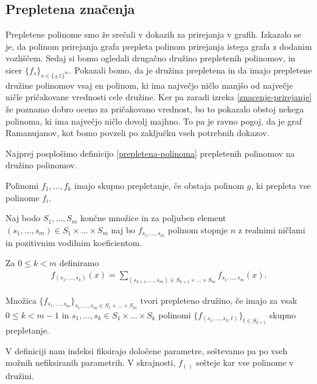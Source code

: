\subsection{Prepletena značenja}
Prepletene polinome smo že srečali v dokazih za prirejanja v grafih. Izkazalo se je, da polinom prirejanja grafa prepleta polinom prirejanja istega grafa z dodanim vozliščem. Sedaj si bomo ogledali drugačno družino prepletenih polinomov, in sicer \(\{f_s\}_{s\in \{\pm 1\}^m}\). Pokazali bomo, da je družina prepletena in da imajo prepletene družine polinomov vsaj en polinom, ki ima največjo ničlo manjšo od največje ničle pričakovane vrednosti cele družine. Ker pa zaradi izreka \ref{znacenje-prirejanje} že poznamo dobro oceno za pričakovano vrednost, bo to pokazalo obstoj nekega polinoma, ki ima največjo ničlo dovolj majhno. To pa je ravno pogoj, da je graf Ramanujanov, kot bomo povzeli po zaključku vseh potrebnih dokazov.

Najprej posplošimo definicijo \ref{prepletena-polinoma} prepletenih polinomov na družino polinomov.
\begin{definicija}
    Polinomi \(f_1, \ldots, f_k\) imajo skupno prepletanje, če obstaja polinom \(g\), ki prepleta vse polinome \(f_i\).
\end{definicija}
\begin{definicija}\label{prepletena-druzina}
    Naj bodo \(S_1, \ldots, S_m\) končne množice in za poljuben element \((s_1, \ldots, s_m)\in S_1\times \ldots \times S_m\) naj bo \(f_{s_1, \ldots, s_m}\) polinom stopnje \(n\) z realnimi ničlami in pozitivnim vodilnim koeficientom.

    Za \(0\leq k<m\) definiramo
    \begin{align*}
        f_{(s_1, \ldots, s_k)}(x) = \sum_{(s_{k+1}, \ldots, s_m)\in S_{k+1}\times \ldots \times S_m} f_{s_1, \ldots, s_m}(x).
    \end{align*}

    Množica \(\{f_{s_1,\ldots, s_m}\}_{s_1,\ldots, s_m\in S_1\times \ldots \times S_m}\) tvori prepleteno družino, če imajo za vsak \(0\leq k<m-1\) in \(s_1, \ldots, s_k\in S_1\times \ldots \times S_k\) polinomi \(\{f_{(s_1, \ldots, s_k, t)}\}_{t\in S_{k+1}}\)  skupno prepletanje.
\end{definicija}
V definiciji nam indeksi fiksirajo določene parametre, seštevamo pa po vseh možnih nefiksiranih parametrih. V skrajnosti, \(f_{()}\) sešteje kar vse polinome v družini.

